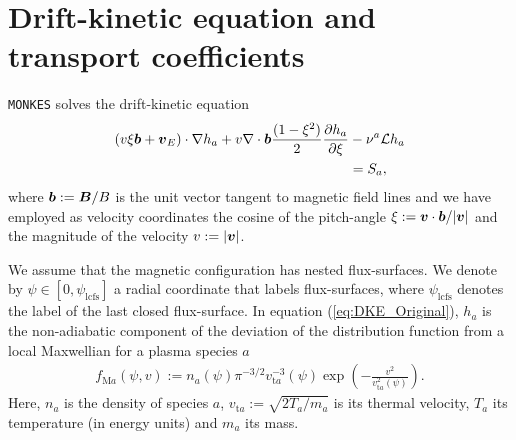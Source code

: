 \documentclass[10pt]{iopart}
\newcommand{\Lorentz}{\mathcal{L}}
\newcommand{\MONKES}{{\texttt{MONKES}}}
\begin{document}
\section{Drift-kinetic equation and transport coefficients}
\label{sec:DKE}
{\MONKES} solves the drift-kinetic equation 
%
\begin{align}
	(v \xi \vb*{b}  + \vb*{v}_E) \cdot \nabla h_a 
	+
	v\nabla \cdot \vb*{b} \frac{(1-\xi^2)}{2}  \pdv{h_a}{\xi}  
	& - \nu^{a} \Lorentz h_a
	\nonumber \\
	& = S_a,
	\label{eq:DKE_Original}
\end{align}
where $\vb*{b}:= \vb*{B}/B$ is the unit vector tangent to magnetic field lines and we have employed as velocity coordinates the cosine of the pitch-angle $\xi := \vb*{v}\cdot\vb*{b}/|\vb*{v}|$ and the magnitude of the velocity $v:=|\vb*{v}|$. 

We assume that the magnetic configuration has nested flux-surfaces. We denote by $\psi\in[0,\psi_{\text{lcfs}}]$ a radial coordinate that labels flux-surfaces, where $\psi_{\text{lcfs}}$ denotes the label of the last closed flux-surface. In equation (\ref{eq:DKE_Original}), $h_a$ is the non-adiabatic component of the deviation of the distribution function from a local Maxwellian for a plasma species $a$ 
%
\begin{align}
	f_{\text{M}a}(\psi, v) :=   n_a(\psi)  \pi^{-3/2}  {v_{\text{t}a}^{-3}(\psi)}  \exp(-\frac{v^2}{v_{\text{t}a}^2(\psi)}).
\end{align}
Here, $n_a$ is the density of species $a$, $v_{\text{t}a} := \sqrt{2T_a/m_a}$ is its thermal velocity, $T_a$ its temperature (in energy units) and $m_a$ its mass. 

%
\end{document}
